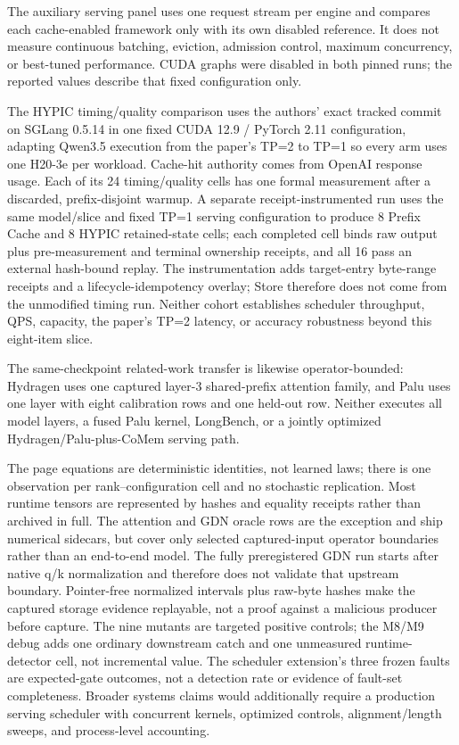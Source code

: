 \documentclass{article}
\begin{document}
The auxiliary serving panel uses one request stream per engine and compares
each cache-enabled framework only with its own disabled reference.  It does not
measure continuous batching, eviction, admission control, maximum concurrency,
or best-tuned performance.  CUDA graphs were disabled in both pinned runs; the
reported values describe that fixed configuration only.

The HYPIC timing/quality comparison uses the authors' exact tracked commit on
SGLang 0.5.14 in one fixed CUDA 12.9 / PyTorch 2.11 configuration, adapting
Qwen3.5 execution from the paper's TP=2 to TP=1 so every arm uses one H20-3e per
workload.  Cache-hit authority comes from OpenAI response usage.  Each of its 24
timing/quality cells has one formal measurement after a discarded,
prefix-disjoint warmup.  A separate receipt-instrumented run uses the same
model/slice and fixed TP=1 serving configuration to produce 8 Prefix Cache and
8 HYPIC retained-state cells; each completed cell binds raw output plus
pre-measurement and terminal ownership receipts, and all 16 pass an external
hash-bound replay.  The instrumentation adds target-entry byte-range receipts
and a lifecycle-idempotency overlay; Store therefore does not come from the
unmodified timing run.  Neither cohort establishes scheduler throughput, QPS,
capacity, the paper's TP=2 latency, or accuracy robustness beyond this
eight-item slice.

The same-checkpoint related-work transfer is likewise operator-bounded:
Hydragen uses one captured layer-3 shared-prefix attention family, and Palu
uses one layer with eight calibration rows and one held-out row.  Neither
executes all model layers, a fused Palu kernel, LongBench, or a jointly
optimized Hydragen/Palu-plus-CoMem serving path.

The page equations are deterministic identities, not learned laws; there is
one observation per rank--configuration cell and no stochastic replication.
Most runtime tensors are represented by hashes and equality receipts rather
than archived in full.  The attention and GDN oracle rows are the exception
and ship numerical sidecars, but cover only selected captured-input operator
boundaries rather than an end-to-end model.  The fully preregistered GDN run
starts after native q/k normalization and therefore does not validate that
upstream boundary.  Pointer-free normalized intervals
plus raw-byte hashes make the captured storage evidence replayable, not a proof
against a malicious producer before capture.  The nine mutants are targeted
positive controls; the M8/M9 debug adds one ordinary downstream catch and one
unmeasured runtime-detector cell, not incremental value.  The scheduler
extension's three frozen faults are expected-gate outcomes, not a detection
rate or evidence of fault-set completeness.  Broader systems claims would
additionally require a production serving scheduler with concurrent kernels,
optimized controls, alignment/length sweeps, and process-level accounting.
\end{document}
